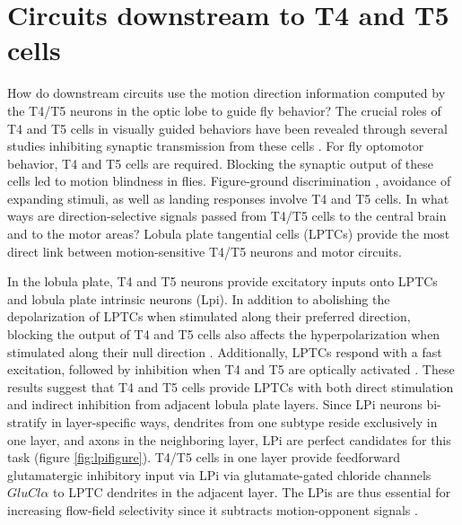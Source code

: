 \section{Circuits downstream to T4 and T5 cells}
How do downstream circuits use the motion direction information computed by the T4/T5 neurons in the optic lobe to guide fly behavior? The crucial roles of T4 and T5 cells in visually guided behaviors have been revealed through several studies inhibiting synaptic transmission from these cells \parencite{Bahl2013}. For fly optomotor behavior, T4 and T5 cells are required. Blocking the synaptic output of these cells led to motion blindness in flies. Figure-ground discrimination \parencite{Fenk2014}, avoidance of expanding stimuli, as well as landing responses \parencite{Schilling2015} involve T4 and T5 cells. In what ways are direction-selective signals passed from T4/T5 cells to the central brain and to the motor areas? Lobula plate tangential cells (LPTCs) provide the most direct link between motion-sensitive T4/T5 neurons and motor circuits. 

In the lobula plate, T4 and T5 neurons provide excitatory inputs onto LPTCs and lobula plate intrinsic neurons (Lpi). In addition to abolishing the depolarization of LPTCs when stimulated along their preferred direction, blocking the output of T4 and T5 cells also affects the hyperpolarization when stimulated along their null direction \parencite{Schnell2012}. Additionally, LPTCs respond with a fast excitation, followed by inhibition when T4 and T5 are optically activated \parencite{Mauss2015}. These results suggest that T4 and T5 cells provide LPTCs with both direct stimulation and indirect inhibition from adjacent lobula plate layers. Since LPi neurons bi-stratify in layer-specific ways, dendrites from one subtype reside exclusively in one layer, and axons in the neighboring layer, LPi are perfect candidates for this task (figure \ref{fig:lpifigure}). T4/T5 cells in one layer provide feedforward glutamatergic inhibitory input via LPi via glutamate-gated chloride channels \textit{$GluCl\alpha$} to LPTC dendrites in the adjacent layer. The LPis are thus essential for increasing flow-field selectivity since it subtracts motion-opponent signals \parencite{Mauss2015}.

